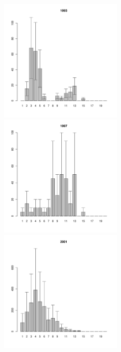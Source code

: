 \documentclass[12pt, a4paper]{article}
\begin{document}
\begin{figure}[h]
\begin{multicols}{3}
\hfill
\includegraphics[width=60mm]{../White_Sea/Luvenga_Goreliy/middle_1993_.pdf}
\hfill
\includegraphics[width=60mm]{../White_Sea/Luvenga_Goreliy/middle_1997_.pdf}
\hfill
\includegraphics[width=60mm]{../White_Sea/Luvenga_Goreliy/middle_2001_.pdf}
\end{multicols}



\end{figure}
\end{document}
